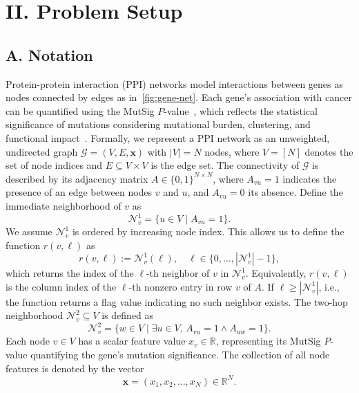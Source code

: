 \documentclass[
  reprint,
  superscriptaddress,
  amsmath,amssymb,
  aps,prl,
]{revtex4-2}
\begin{document}
\section{II. Problem Setup}
%
\subsection{A. Notation}
%
\noindent
Protein-protein interaction (PPI) networks model interactions between genes as nodes connected by edges as in~\cref{fig:gene-net}. Each gene’s association with cancer can be quantified using the MutSig \(P\)-value~\cite{lohr2012discovery, lawrence2014discovery}, which reflects the statistical significance of mutations considering mutational burden, clustering, and functional impact~\cite{gumpinger2020prediction}.
%
%
%
Formally, we represent a PPI network as an unweighted, undirected graph \(\mathcal{G} = (V, E, \boldsymbol{x})\) with \(|V| = N\) nodes, where \(V = [N]\) denotes the set of node indices and \(E \subseteq V \times V\) is the edge set. The connectivity of \(\mathcal{G}\) is described by its adjacency matrix \(A \in \{0,1\}^{N \times N}\), where \(A_{vu} = 1\) indicates the presence of an edge between nodes \(v\) and \(u\), and \(A_{vu} = 0\) its absence. Define the immediate neighborhood of \(v\) as
\begin{equation}
\mathcal{N}^1_v = \{ u \in V \mid A_{vu} = 1 \}.
\end{equation}
%
We assume \(\mathcal{N}^1_v\) is ordered by increasing node index. This allows us to define the function \(r(v, \ell)\) as
\begin{equation}
r(v, \ell) := \mathcal{N}^1_v(\ell),
\quad \ell \in \{0, \ldots, |\mathcal{N}^1_v| - 1\},
\end{equation}
\noindent which returns the index of the \(\ell\)-th neighbor of \(v\) in \(\mathcal{N}^1_v\). Equivalently, \(r(v, \ell)\) is the column index of the \(\ell\)-th nonzero entry in row \(v\) of \(A\). If \(\ell \geq |\mathcal{N}^1_v|\), i.e., the function returns a flag value indicating no such neighbor exists.
The two-hop neighborhood \(\mathcal{N}^2_v \subseteq V\) is defined as
\begin{equation}
\mathcal{N}^2_v = \{ w \in V \mid \exists u \in V,\, A_{vu} = 1 \wedge A_{uw} = 1 \}.
\end{equation}
Each node \(v \in V\) has a scalar feature value \(x_v \in \mathbb{R}\), representing its MutSig \(P\)-value quantifying the gene’s mutation significance. The collection of all node features is denoted by the vector
\begin{equation}
\boldsymbol{x} = (x_1, x_2, \ldots, x_N) \in \mathbb{R}^N.
\label{eq:initial-features}
\end{equation}
\end{document}

